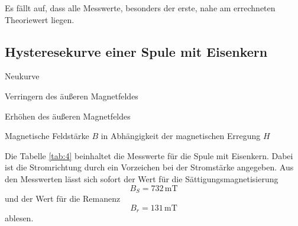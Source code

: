 Es fällt auf, dass alle Messwerte, besonders der erste,
nahe am errechneten Theoriewert liegen.


\subsection{Hysteresekurve einer Spule mit Eisenkern}

  \begin{table}[H]
  \centering
  
    \begin{subtable}{.33\linewidth}
      \centering
      \small
  \caption{Neukurve}
    \end{subtable}%
    \begin{subtable}{.33\linewidth}
      \centering
      \small
  \caption{Verringern des äußeren Magnetfeldes}
    \end{subtable} 
    \begin{subtable}{.33\linewidth}
      \centering
      \small
  \caption{Erhöhen des äußeren Magnetfeldes}
    \end{subtable} 
        \caption{Magnetische Feldstärke $B$ in Abhängigkeit der magnetischen Erregung $H$}
    \label{tab:4}
\end{table}

Die Tabelle \ref{tab:4} beinhaltet die Messwerte für
die Spule mit Eisenkern. Dabei ist die Stromrichtung
durch ein Vorzeichen bei der Stromstärke angegeben. Aus
den Messwerten lässt sich sofort der Wert für die
Sättigungsmagnetisierung 
\begin{equation}
  B_S=732\,\si{\milli\tesla}\nonumber
\end{equation}
\noindent und der Wert für die Remanenz
\begin{equation}
  B_r=131\,\si{\milli\tesla}\nonumber
\end{equation}
\noindent ablesen.

